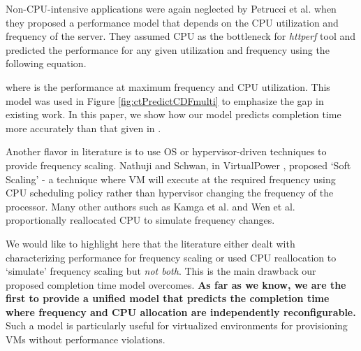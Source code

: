 \documentclass{sig-alternate}
\begin{document}
Non-CPU-intensive applications were again neglected by Petrucci et al. \cite{Petrucci2011} when they proposed a performance model that depends on the CPU utilization and frequency of the server. They assumed CPU as the bottleneck for \emph{httperf} tool and predicted the performance  for any given utilization  and frequency  using the following equation. 

\begin{center}\end{center}

where  is the performance at maximum frequency  and CPU utilization. This model was used in Figure \ref{fig:ctPredictCDFmulti} to emphasize the gap in existing work. In this paper, we show how our model predicts completion time more accurately than that given in \cite{Petrucci2011}. 

Another flavor in literature is to use OS or hypervisor-driven techniques to provide frequency scaling. Nathuji and Schwan, in VirtualPower \cite{Nathuji2007}, proposed `Soft Scaling' - a technique where VM will execute at the required frequency using CPU scheduling policy rather than hypervisor changing the frequency of the processor. Many other authors such as Kamga et al. \cite{Kamga2011} and Wen et al. \cite{Wen2010} proportionally reallocated CPU to simulate frequency changes. 

We would like to highlight here that the literature either dealt with characterizing performance for frequency scaling or used CPU reallocation to `simulate' frequency scaling but \emph{not both}. This is the main drawback our proposed completion time model overcomes. \textbf{As far as we know, we are the first to provide a unified model that predicts the completion time where frequency and CPU allocation are independently reconfigurable.} Such a model is particularly useful for virtualized environments for provisioning VMs without performance violations.
\end{document}
